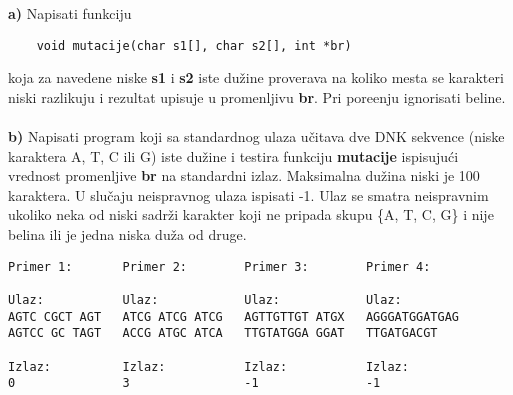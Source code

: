 \begin{Exercise}[label=v1.3_01] 
    \textbf{a)} Napisati funkciju
    \begin{verbatim}
    void mutacije(char s1[], char s2[], int *br)   
    \end{verbatim}
    koja za navedene niske \textbf{s1} i \textbf{s2} iste dužine proverava na koliko mesta se karakteri niski razlikuju i rezultat upisuje u promenljivu \textbf{br}.
    Pri pore\dj enju ignorisati beline.
    \\
    \\
    \textbf{b)} Napisati program koji sa standardnog ulaza učitava dve DNK sekvence (niske karaktera A, T, C ili G) iste dužine i testira funkciju \textbf{mutacije} ispisujući vrednost promenljive \textbf{br} na standardni izlaz. Maksimalna du\v zina niski je 100 karaktera. U slučaju neispravnog ulaza ispisati -1. Ulaz se smatra neispravnim ukoliko neka od niski sadrži karakter koji ne pripada skupu \{A, T, C, G\} i nije belina
   ili je jedna niska duža od druge.
     


\begin{center}
\begin{verbatim}
Primer 1:       Primer 2:        Primer 3:        Primer 4:  

Ulaz:           Ulaz:            Ulaz:            Ulaz:
AGTC CGCT AGT   ATCG ATCG ATCG   AGTTGTTGT ATGX   AGGGATGGATGAG
AGTCC GC TAGT   ACCG ATGC ATCA   TTGTATGGA GGAT   TTGATGACGT

Izlaz:          Izlaz:           Izlaz:           Izlaz:
0               3                -1               -1
\end{verbatim}
\end{center}
\end{Exercise}
\begin{Answer}[ref=v1.3_01]
\end{Answer}

